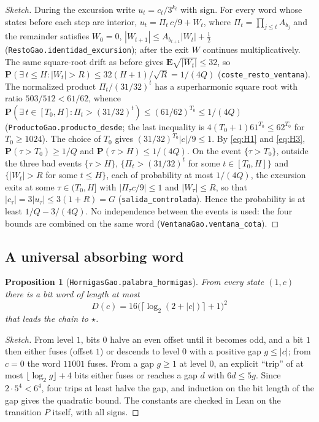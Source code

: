 \documentclass[11pt]{amsart}
\newtheorem{proposition}[theorem]{Proposition}
\theoremstyle{definition}
\theoremstyle{remark}
\newcommand{\Prob}{\mathbf{P}}
\newcommand{\E}{\mathbf{E}}
\newcommand{\fus}{\star}
\newcommand{\lean}[1]{\nolinkurl{#1}}
\begin{document}
\begin{proof}[Sketch]
During the excursion write $u_t=c_t/3^{k_t}$ with sign. For every word whose states before each step are interior, $u_t=\Pi_t\,c/9+W_t$, where $\Pi_t=\prod_{j\le t}A_{b_j}$ and the remainder satisfies $W_0=0$, $|W_{t+1}|\le A_{b_{t+1}}|W_t|+\tfrac12$ (\lean{RestoGao.identidad_excursion}); after the exit $W$ continues multiplicatively. The same square-root drift as before gives $\E\sqrt{|W_t|}\le32$, so $\Prob(\exists\, t\le H: |W_t|>R)\le 32(H+1)/\sqrt R=1/(4Q)$ (\lean{coste_resto_ventana}). The normalized product $\Pi_t/(31/32)^t$ has a superharmonic square root with ratio $503/512<61/62$, whence $\Prob(\exists\, t\in[T_0,H]:\Pi_t>(31/32)^t)\le(61/62)^{T_0}\le 1/(4Q)$ (\lean{ProductoGao.producto_desde}; the last inequality is $4(T_0+1)61^{T_0}\le 62^{T_0}$ for $T_0\ge1024$). The choice of $T_0$ gives $(31/32)^{T_0}|c|/9\le1$. By \eqref{eq:H1} and \eqref{eq:H3}, $\Prob(\tau>T_0)\ge 1/Q$ and $\Prob(\tau>H)\le 1/(4Q)$. On the event $\{\tau>T_0\}$, outside the three bad events $\{\tau>H\}$, $\{\Pi_t>(31/32)^t$ for some $t\in[T_0,H]\}$ and $\{|W_t|>R$ for some $t\le H\}$, each of probability at most $1/(4Q)$, the excursion exits at some $\tau\in(T_0,H]$ with $|\Pi_\tau c/9|\le1$ and $|W_\tau|\le R$, so that $|c_\tau|=3|u_\tau|\le 3(1+R)=G$ (\lean{salida_controlada}). Hence the probability is at least $1/Q-3/(4Q)$. No independence between the events is used: the four bounds are combined on the same word (\lean{VentanaGao.ventana_cota}).
\end{proof}

\subsection{A universal absorbing word}

\begin{proposition}[\lean{HormigasGao.palabra_hormigas}]\label{prop:hormigas}
From every state $(1,c)$ there is a bit word of length at most
\[
D(c)=16\bigl(\lceil\log_2(2+|c|)\rceil+1\bigr)^2
\]
that leads the chain to $\fus$.
\end{proposition}

\begin{proof}[Sketch]
From level $1$, bits $0$ halve an even offset until it becomes odd, and a bit $1$ then either fuses (offset $1$) or descends to level $0$ with a positive gap $g\le|c|$; from $c=0$ the word $11001$ fuses. From a gap $g\ge1$ at level $0$, an explicit ``trip'' of at most $\lfloor\log_2 g\rfloor+4$ bits either fuses or reaches a gap $d$ with $6d\le 5g$. Since $2\cdot5^4<6^4$, four trips at least halve the gap, and induction on the bit length of the gap gives the quadratic bound. The constants are checked in Lean on the transition $P$ itself, with all signs.
\end{proof}
\end{document}
